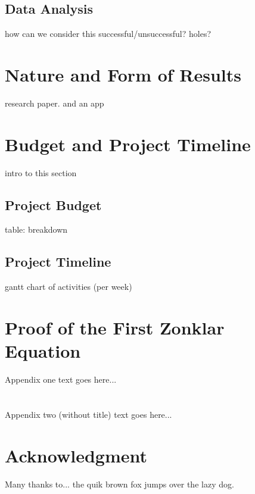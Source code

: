 \documentclass[journal]{./IEEE/IEEEtran}
\begin{document}
\subsection{Data Analysis}
how can we consider this successful/unsuccessful? holes?

\section{Nature and Form of Results}
research paper. and an app

\section{Budget and Project Timeline}
intro to this section

\subsection{Project Budget}
table: breakdown

\subsection{Project Timeline}
gantt chart of activities (per week)

\appendices

\section{Proof of the First Zonklar Equation}
Appendix one text goes here...

\section{}
Appendix two (without title) text goes here...

\section*{Acknowledgment}
Many thanks to... the quik brown fox jumps over the lazy dog.



\end{document}
